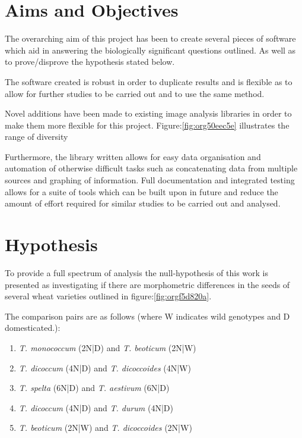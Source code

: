 \documentclass[11pt]{report}
\begin{document}
\section{Aims and Objectives}
\label{sec:orgf5d4856}

The overarching aim of this project has been to create several pieces of software which aid in answering the biologically significant questions outlined. As well as to prove/disprove the hypothesis stated below.

The software created is robust in order to duplicate results and is flexible as to allow for further studies to be carried out and to use the same method.

Novel additions have been made to existing image analysis libraries in order to make them more flexible for this project. Figure:\ref{fig:org50eec5e} illustrates the range of diversity

Furthermore, the library written allows for easy data organisation and automation of otherwise difficult tasks such as concatenating data from multiple sources and graphing of information. Full documentation and integrated testing allows for a suite of tools which can be built upon in future and reduce the amount of effort required for similar studies to be carried out and analysed.

\section{Hypothesis}
\label{sec:org3fdbdca}
To provide a full spectrum of analysis the null-hypothesis of this work is presented as investigating if there are morphometric differences in the seeds of several wheat varieties outlined in figure:\ref{fig:orgf5d820a}.

The comparison pairs are as follows (where W indicates wild genotypes and D domesticated.):

\begin{enumerate}
\item \emph{T. monococcum} (2N|D) and \emph{T. beoticum} (2N|W)
\item \emph{T. dicoccum} (4N|D) and \emph{T. dicoccoides} (4N|W)
\item \emph{T. spelta} (6N|D) and \emph{T. aestivum} (6N|D)
\item \emph{T. dicoccum} (4N|D) and \emph{T. durum} (4N|D)
\item \emph{T. beoticum} (2N|W) and \emph{T. dicoccoides} (2N|W)
\end{enumerate}
\end{document}
